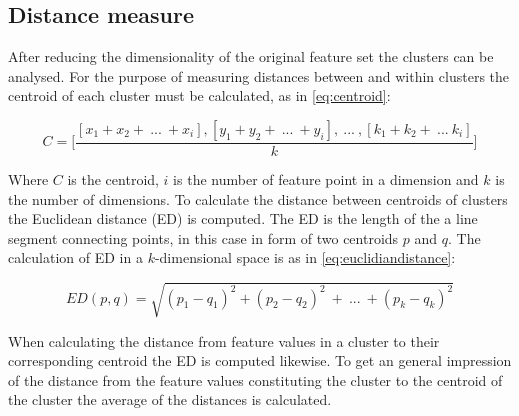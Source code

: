 \subsection{Distance measure}
After reducing the dimensionality of the original feature set the clusters can be analysed. For the purpose of measuring distances between and within clusters the centroid of each cluster must be calculated, as in \eqref{eq:centroid}:

\begin{equation} \label{eq:centroid}
	C = \Bigg[ \frac{[x_1+x_2 +~...~+ x_i],[y_1+y_2 +~...~+ y_i] ,~...~,[k_1+k_2 +~...~k_i]}{k} \Bigg]
\end{equation}

Where $C$ is the centroid, $i$ is the number of feature point in a dimension and $k$ is the number of dimensions. To calculate the distance between centroids of clusters the Euclidean distance (ED) is computed. The ED is the length of the a line segment connecting points, in this case in form of two centroids $p$ and $q$. The calculation of ED in a $k$-dimensional space is as in \eqref{eq:euclidiandistance}:

\begin{equation} \label{eq:euclidiandistance}
	ED(p,q) = \sqrt{(p_1-q_1)^2 + (p_2-q_2)^2~+~...~+ (p_k-q_k)^2}
\end{equation} 

When calculating the distance from feature values in a cluster to their corresponding centroid the ED is computed likewise. To get an general impression of the distance from the feature values constituting the cluster to the centroid of the cluster the average of the distances is calculated. 
